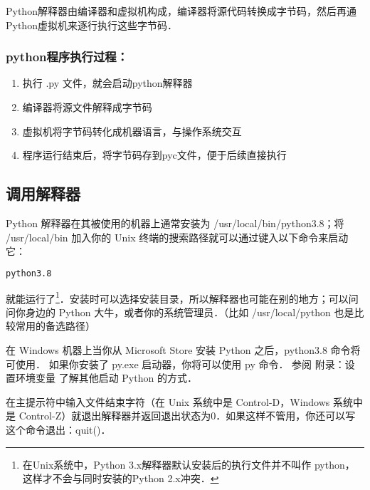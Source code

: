 
\begin{issues}
\issueTODO
\issueDraft
\end{issues}


Python解释器由编译器和虚拟机构成，编译器将源代码转换成字节码，然后再通Python虚拟机来逐行执行这些字节码．

\subsubsection{python程序执行过程：}

\begin{enumerate}
\item 执行 .py 文件，就会启动python解释器

\item 编译器将源文件解释成字节码

\item 虚拟机将字节码转化成机器语言，与操作系统交互

\item 程序运行结束后，将字节码存到pyc文件，便于后续直接执行
\end{enumerate}

\subsection{调用解释器}
Python 解释器在其被使用的机器上通常安装为 /usr/local/bin/python3.8；将 /usr/local/bin 加入你的 Unix 终端的搜索路径就可以通过键入以下命令来启动它：

\begin{lstlisting}[language=bash]
python3.8
\end{lstlisting}

就能运行了\footnote{在Unix系统中，Python 3.x解释器默认安装后的执行文件并不叫作 python，这样才不会与同时安装的Python 2.x冲突．}．安装时可以选择安装目录，所以解释器也可能在别的地方；可以问问你身边的 Python 大牛，或者你的系统管理员．（比如 /usr/local/python 也是比较常用的备选路径）

在 Windows 机器上当你从 Microsoft Store 安装 Python 之后，python3.8 命令将可使用． 如果你安装了 py.exe 启动器，你将可以使用 py 命令． 参阅 附录：设置环境变量 了解其他启动 Python 的方式．

在主提示符中输入文件结束字符（在 Unix 系统中是 Control-D，Windows 系统中是 Control-Z）就退出解释器并返回退出状态为0．如果这样不管用，你还可以写这个命令退出：quit()．

